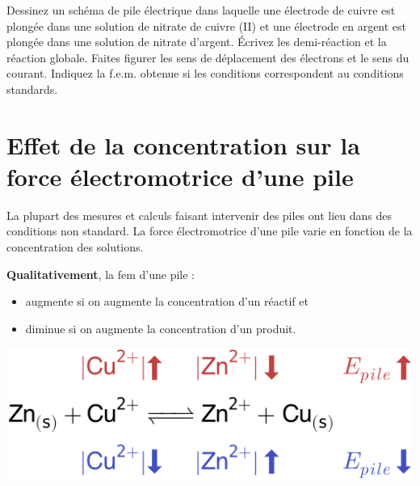 \documentclass[
  11pt,
  a4paper,
  openany]{book}
\providecommand{\tightlist}{%
  \setlength{\itemsep}{0pt}\setlength{\parskip}{0pt}}
\begin{document}
\begin{Exercise}

Dessinez un schéma de pile électrique dans laquelle une électrode de cuivre est plongée dans une solution de nitrate de cuivre (II) et une électrode en argent est plongée dans une solution de nitrate d'argent. Écrivez les demi-réaction et la réaction globale. Faites figurer les sens de déplacement des électrons et le sens du courant. Indiquez la f.e.m. obtenue si les conditions correspondent au conditions standards.


\end{Exercise}

\clearpage

\section{Effet de la concentration sur la force électromotrice d'une pile}\label{effet-de-la-concentration-sur-la-force-uxe9lectromotrice-dune-pile}

La plupart des mesures et calculs faisant intervenir des piles ont lieu dans des conditions non standard. La force électromotrice d'une pile varie en fonction de la concentration des solutions.

\textbf{Qualitativement}, la fem d'une pile :

\begin{itemize}
\tightlist
\item
  augmente si on augmente la concentration d'un réactif et
\item
  diminue si on augmente la concentration d'un produit.
\end{itemize}

\begin{center}\includegraphics[width=0.5\linewidth]{images/nernst-illustration} \end{center}
\end{document}
